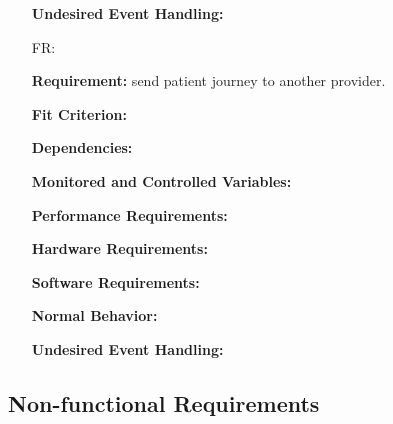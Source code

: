 \documentclass[12pt]{article}
\newcounter{reqnum} %
\begin{document}
\begin{itemize}
\textbf{Undesired Event Handling:} 

\item[FR\refstepcounter{reqnum}\thereqnum \label{FR_meaningfulLabel}:] 

\textbf{Requirement:} send patient journey to another provider.

\textbf{Fit Criterion:}  

\textbf{Dependencies:}  

\textbf{Monitored and Controlled Variables:} 

\textbf{Performance Requirements:} 

\textbf{Hardware Requirements:} 

\textbf{Software Requirements:} 

\textbf{Normal Behavior:} 

\textbf{Undesired Event Handling:} 

\end{itemize}


\subsection{Non-functional Requirements} \label{sec_NonFunctionalRequirements}
\end{document}
